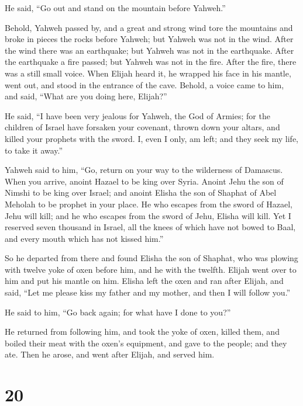  He said, ``Go out and stand on the mountain before
Yahweh.''

Behold, Yahweh passed by, and a great and strong wind tore the mountains
and broke in pieces the rocks before Yahweh; but Yahweh was not in the
wind. After the wind there was an earthquake; but Yahweh was not in the
earthquake.  After the earthquake a fire passed; but
Yahweh was not in the fire. After the fire, there was a still small
voice.  When Elijah heard it, he wrapped his face in his
mantle, went out, and stood in the entrance of the cave. Behold, a voice
came to him, and said, ``What are you doing here, Elijah?''

 He said, ``I have been very jealous for Yahweh, the God
of Armies; for the children of Israel have forsaken your covenant,
thrown down your altars, and killed your prophets with the sword. I,
even I only, am left; and they seek my life, to take it away.''

 Yahweh said to him, ``Go, return on your way to the
wilderness of Damascus. When you arrive, anoint Hazael to be king over
Syria.  Anoint Jehu the son of Nimshi to be king over
Israel; and anoint Elisha the son of Shaphat of Abel Meholah to be
prophet in your place.  He who escapes from the sword of
Hazael, Jehu will kill; and he who escapes from the sword of Jehu,
Elisha will kill.  Yet I reserved seven thousand in
Israel, all the knees of which have not bowed to Baal, and every mouth
which has not kissed him.''

 So he departed from there and found Elisha the son of
Shaphat, who was plowing with twelve yoke of oxen before him, and he
with the twelfth. Elijah went over to him and put his mantle on him.
 Elisha left the oxen and ran after Elijah, and said,
``Let me please kiss my father and my mother, and then I will follow
you.''

He said to him, ``Go back again; for what have I done to you?''

 He returned from following him, and took the yoke of
oxen, killed them, and boiled their meat with the oxen's equipment, and
gave to the people; and they ate. Then he arose, and went after Elijah,
and served him.

\hypertarget{section-19}{%
\section{20}\label{section-19}}

